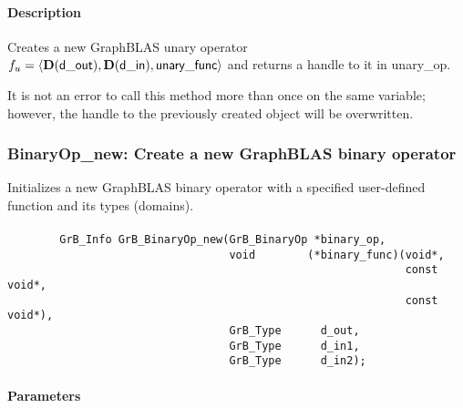 \paragraph{Description}

Creates a new GraphBLAS unary operator $f_u = \langle \mathbf{D}({\sf d\_out}), 
\mathbf{D}({\sf d\_in}), {\sf unary\_func} \rangle$ and returns a handle to it 
in {\sf unary\_op}.

It is not an error to call this method more than once on the same variable;  
however, the handle to the previously created object will be overwritten. 


\subsubsection{{\sf BinaryOp\_new}: Create a new GraphBLAS binary operator}

Initializes a new GraphBLAS binary operator with a specified user-defined 
function and its types (domains).

\paragraph{\syntax}

\begin{verbatim}
        GrB_Info GrB_BinaryOp_new(GrB_BinaryOp *binary_op,
                                  void        (*binary_func)(void*,
                                                             const void*,
                                                             const void*),
                                  GrB_Type      d_out,
                                  GrB_Type      d_in1,
                                  GrB_Type      d_in2);
\end{verbatim}

\paragraph{Parameters}

